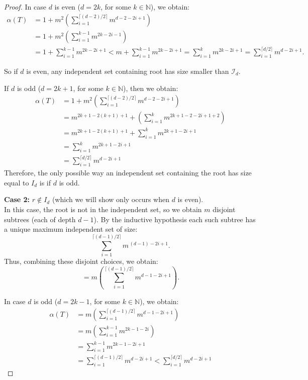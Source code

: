 \documentclass[10pt]{amsart}
\theoremstyle{definition}
\newcommand\II{{\mathcal I}}
\begin{document}
\begin{proof}
	In case $d$ is even ($d = 2k$, for some $k \in \mathbb{N}$), we obtain:
	\begin{align*}
		\alpha(T) & = 1 + m^2\left(\sum_{i=1}^{\lceil (d-2)/2 \rceil} m^{d - 2 -2i+1}\right)                                                                         \\
		          & = 1 + m^2\left(\sum_{i=1}^{k-1} m^{2k-2i-1}\right)                                                                                               \\
		          & = 1 + \sum_{i=1}^{k-1} m^{2k-2i+1} < m + \sum_{i=1}^{k-1} m^{2k-2i+1} = \sum_{i=1}^{k} m^{2k-2i+1} = \sum_{i = 1}^{\lceil d/2 \rceil}m^{d-2i+1}.
	\end{align*}

	So if $d$ is even, any independent set containing root has size smaller than $\II_d$.
	\newline

	If $d$ is odd ($d = 2k + 1$, for some $k \in \mathbb{N}$), then we obtain:
	\begin{align*}
		\alpha(T) & = 1 + m^2\left(\sum_{i=1}^{\lceil (d-2)/2 \rceil} m^{d - 2 -2i+1}\right)                \\
		          & = m^{2k + 1 - 2(k + 1) + 1} + \left(\sum_{i = 1}^{k} m^{2k + 1 - 2 - 2i + 1 + 2}\right) \\
		          & = m^{2k + 1 - 2(k + 1) + 1} + \sum_{i = 1}^{k} m^{2k + 1 - 2i + 1}                      \\
		          & = \sum_{i = 1}^{k} m^{2k + 1 - 2i + 1}                                                  \\
		          & = \sum_{i = 1}^{\lceil d/2 \rceil}m^{d-2i+1}
	\end{align*}
	Therefore, the only possible way an independent set containing the root has size equal to $I_d$ is if $d$ is odd.

	\medskip

	\textbf{Case 2:} $r\notin I_{d}$ (which we will show only occurs when $d$ is even).\\[1mm]
	In this case, the root is not in the independent set, so we obtain $m$ disjoint subtrees (each of depth $d-1$). By the inductive hypothesis each such subtree has a unique maximum independent set of size:
	\[
		\sum_{i=1}^{\lceil (d-1)/2 \rceil} m^{\, (d-1)-2i+1}.
	\]
	Thus, combining these disjoint choices, we obtain:
	\[
		= m\left(\sum_{i=1}^{\lceil (d-1)/2 \rceil} m^{d-1-2i+1}\right).
	\]

	In case $d$ is odd ($d = 2k - 1$, for some $k \in \mathbb{N}$), we obtain:
	\begin{align*}
		\alpha(T) & = m\left(\sum_{i=1}^{\lceil (d-1)/2 \rceil} m^{d - 1 -2i+1}\right) \\
		          & = m\left(\sum_{i=1}^{k - 1} m^{2k - 1 - 2i}\right)                 \\
		          & = \sum_{i=1}^{k - 1} m^{2k - 1 - 2i + 1}                           \\
		          & = \sum_{i = 1}^{\lceil (d - 1)/ 2\rceil}m^{d-2i+1}
		< \sum_{i = 1}^{\lceil d/2 \rceil}m^{d - 2i + 1}
	\end{align*}


\end{proof}
\end{document}
